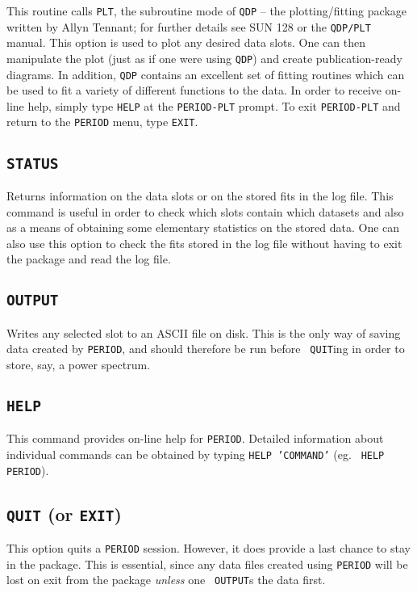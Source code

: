 This routine calls {\tt PLT}, the subroutine mode of {\tt QDP} -- the
plotting/fitting package written by Allyn Tennant; for further details see SUN
128 or the {\tt QDP/PLT} manual. This option is used to plot any desired data
slots. One can then manipulate the plot (just as if one were using {\tt QDP})
and create publication-ready diagrams. In addition, {\tt QDP} contains an
excellent set of fitting routines which can be used to fit a variety of
different functions to the data. In order to receive on-line help, simply type
{\tt HELP} at the {\tt PERIOD-PLT} prompt. To exit {\tt PERIOD-PLT} and return
to the {\tt PERIOD} menu, type {\tt EXIT}. 

\subsection*{\tt STATUS}

Returns information on the data slots or on the stored fits in the log file.
This command is useful in order to check which slots contain which datasets
and also as a means of obtaining some elementary statistics on the stored data. 
One can also use this option to check the fits stored in the log file without
having to exit the package and read the log file. 

\subsection*{\tt OUTPUT}

Writes any selected slot to an ASCII file on disk. This is the only way of
saving data created by {\tt PERIOD}, and should therefore be run before {\tt
QUIT}ing in order to store, say, a power spectrum. 

\subsection*{\tt HELP}

This command provides on-line help for {\tt PERIOD}. Detailed information about
individual commands can be obtained by typing {\tt HELP 'COMMAND'} (eg. {\tt
HELP PERIOD}). 

\subsection*{{\tt QUIT} (or {\tt EXIT})}

This option quits a {\tt PERIOD} session. However, it does provide a last
chance to stay in the package. This is essential, since any data files created
using {\tt PERIOD} will be lost on exit from the package {\em unless} one {\tt
OUTPUT}s the data first. 

